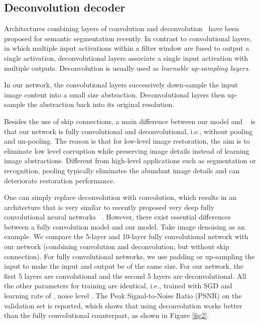 \documentclass[10pt,journal,compsoc]{IEEEtran}
\begin{document}
\subsection{Deconvolution decoder}

Architectures combining layers of convolution and deconvolution~\cite{DBLP:conf/iccv/NohHH15,
hong2015decoupled} have been proposed for semantic segmentation recently. In contrast to
convolutional layers, in which multiple input activations within a filter window are fused
to output a single activation, deconvolutional layers associate a single input activation with
multiple outputs. Deconvolution is usually used as {\em learnable up-sampling layers}.

 In our network,
the convolutional layers successively down-sample the input image content into a  small
size abstraction. Deconvolutional layers then up-sample the abstraction back into its original resolution.

Besides the use of skip connections, a main difference between our model and
~\cite{DBLP:conf/iccv/NohHH15,hong2015decoupled} is that our network is fully convolutional and
deconvolutional, i.e., without pooling and un-pooling. The reason is that for low-level image restoration,
the aim is to eliminate low level corruption while preserving image details instead of learning
image abstractions. Different from high-level applications such as segmentation or recognition,
pooling typically eliminates the abundant image details and can deteriorate restoration performance.



One can simply replace deconvolution with convolution, which results in an architecture that is
very similar to recently proposed very deep fully convolutional neural networks
~\cite{DBLP:conf/cvpr/LongSD15,DBLP:journals/pami/DongLHT16}. However, there exist essential
differences between a fully convolution model and our model. Take image denoising as an example.
We compare the 5-layer and 10-layer fully convolutional network with our network
(combining convolution and deconvolution, but without skip connection). For fully convolutional
networks, we use padding or up-sampling the input to make the input and output be of the same size.
For our network, the first 5 layers are convolutional and the second 5 layers are deconvolutional.
All the other parameters for training are identical, i.e., trained with SGD and learning rate of
, noise level . The Peak Signal-to-Noise Ratio (PSNR) on the validation set
is reported, which shows that using deconvolution works better than the fully convolutional
counterpart, as shown in Figure \ref{fig2}.
\end{document}
